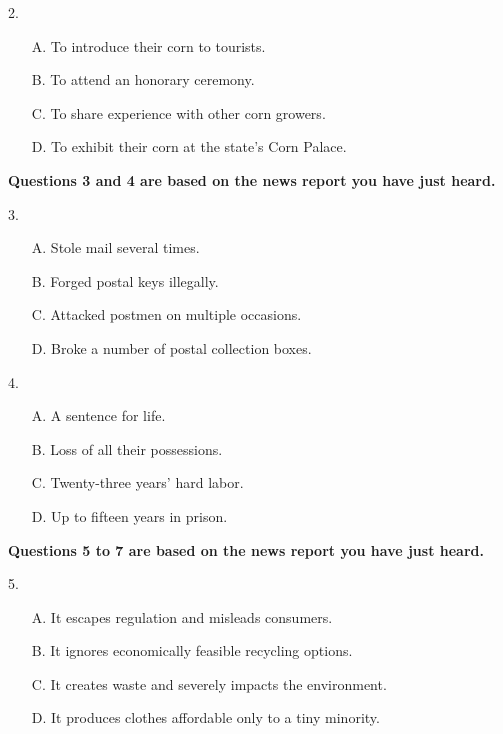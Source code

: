 \documentclass[UTF8,11pt]{ctexart}
\begin{document}
2.


\begin{itemize}[leftmargin=2em,itemsep=.2em,topsep=.4em]\item[A.] To introduce their corn to tourists.
\item[B.] To attend an honorary ceremony.
\item[C.] To share experience with other corn growers.
\item[D.] To exhibit their corn at the state’s Corn Palace.
\end{itemize}

\textbf{Questions 3 and 4 are based on the news report you have just heard.}


3.


\begin{itemize}[leftmargin=2em,itemsep=.2em,topsep=.4em]\item[A.] Stole mail several times.
\item[B.] Forged postal keys illegally.
\item[C.] Attacked postmen on multiple occasions.
\item[D.] Broke a number of postal collection boxes.
\end{itemize}

4.


\begin{itemize}[leftmargin=2em,itemsep=.2em,topsep=.4em]\item[A.] A sentence for life.
\item[B.] Loss of all their possessions.
\item[C.] Twenty-three years’ hard labor.
\item[D.] Up to fifteen years in prison.
\end{itemize}

\textbf{Questions 5 to 7 are based on the news report you have just heard.}


5.


\begin{itemize}[leftmargin=2em,itemsep=.2em,topsep=.4em]\item[A.] It escapes regulation and misleads consumers.
\item[B.] It ignores economically feasible recycling options.
\item[C.] It creates waste and severely impacts the environment.
\item[D.] It produces clothes affordable only to a tiny minority.
\end{itemize}
\end{document}
